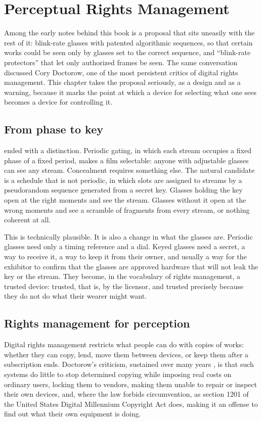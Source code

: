 \chapter{Perceptual Rights Management}\label{ch:perceptual-rights}

Among the early notes behind this book is a proposal that sits uneasily with the rest of it: blink-rate glasses with patented algorithmic sequences, so that certain works could be seen only by glasses set to the correct sequence, and ``blink-rate protectors'' that let only authorized frames be seen. The same conversation discussed Cory Doctorow, one of the most persistent critics of digital rights management. This chapter takes the proposal seriously, as a design and as a warning, because it marks the point at which a device for selecting what one sees becomes a device for controlling it.

\section{From phase to key}

 ended with a distinction. Periodic gating, in which each stream occupies a fixed phase of a fixed period, makes a film selectable: anyone with adjustable glasses can see any stream. Concealment requires something else. The natural candidate is a schedule that is not periodic, in which slots are assigned to streams by a pseudorandom sequence generated from a secret key. Glasses holding the key open at the right moments and see the stream. Glasses without it open at the wrong moments and see a scramble of fragments from every stream, or nothing coherent at all.

This is technically plausible. It is also a change in what the glasses are. Periodic glasses need only a timing reference and a dial. Keyed glasses need a secret, a way to receive it, a way to keep it from their owner, and usually a way for the exhibitor to confirm that the glasses are approved hardware that will not leak the key or the stream. They become, in the vocabulary of rights management, a trusted device: trusted, that is, by the licensor, and trusted precisely because they do not do what their wearer might want.

\section{Rights management for perception}

Digital rights management restricts what people can do with copies of works: whether they can copy, lend, move them between devices, or keep them after a subscription ends. Doctorow's criticism, sustained over many years \cite{doctorow}, is that such systems do little to stop determined copying while imposing real costs on ordinary users, locking them to vendors, making them unable to repair or inspect their own devices, and, where the law forbids circumvention, as section 1201 of the United States Digital Millennium Copyright Act does, making it an offense to find out what their own equipment is doing.

